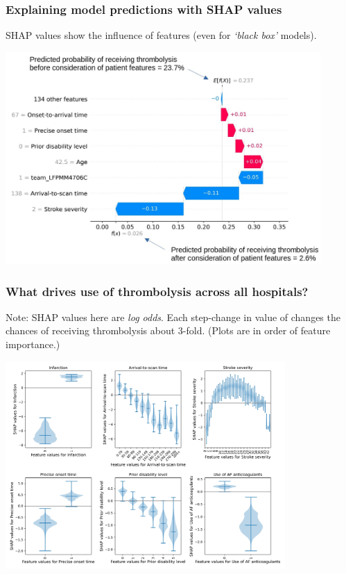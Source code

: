 \documentclass{beamer}
\begin{document}

\begin{frame}
\frametitle{Explaining model predictions with SHAP values}

SHAP values show the influence of features (even for \emph{`black box'} models).

\begin{center}
\includegraphics[width=0.90\textwidth]{./images/waterfall.jpg}
\end{center}
\end{frame}



\begin{frame}
\frametitle{What drives use of thrombolysis across all hospitals?}

\footnotesize{Note: SHAP values here are \emph{log odds}. Each step-change in value of  changes the chances of receiving thrombolysis about 3-fold. (Plots are in order of feature importance.)}

\begin{center}
\includegraphics[width=0.80\textwidth]{./images/03_xgb_10_features_thrombolysis_shap_violin.jpg}
\end{center}
\end{frame}
\end{document}
